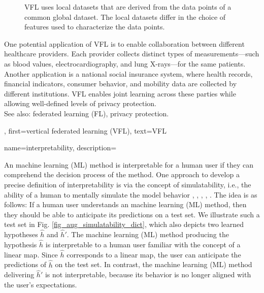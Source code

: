 {{{\begin{figure}[H]
\begin{center}
			\end{center}
			\caption{VFL uses local datasets that are derived from the data points of a common global dataset. 
				The local datasets differ in the choice of features used to characterize the data points.\label{fig_vertical_FL_dict}}
		\end{figure}
		One potential application of VFL is to enable collaboration between 
		different healthcare providers. Each provider collects distinct types of measurements—such as blood 
		values, electrocardiography, and lung X-rays—for the same patients. Another application is a 
		national social insurance system, where health records, financial indicators, consumer behavior, 
		and mobility data are collected by different institutions. VFL enables joint learning across 
		these parties while allowing well-defined levels of privacy protection.
		\\
		See also: federated learning (FL), privacy protection.},
	first={vertical federated learning (VFL)},
	text={VFL}
} 

{name={interpretability},
	description={An machine learning (ML) method is interpretable for a 
 		human user if they can comprehend the decision process of the method. 
		One approach to develop a precise definition of interpretability is via the concept  
 		of simulatability, i.e., the ability of a human to mentally simulate the model behavior 
		\cite{Colin:2022aa}, \cite{Chen2018}, \cite{doshi2017towards}, \cite{hase-bansal-2020-evaluating}, \cite{Lipton2018}. 
 		The idea is as follows: If a human user understands an machine learning (ML) method, then they should 
 		be able to anticipate its predictions on a test set. We illustrate 
 		such a test set in Fig. \ref{fig_aug_simulatability_dict}, which also depicts 
		two learned hypotheses $\hat{h}$ and $\hat{h}'$. 
		The machine learning (ML) method producing the hypothesis $\hat{h}$ is interpretable
		to a human user familiar with the concept of a linear map. 
    		Since $\hat{h}$ corresponds to a linear map, the user can 
		anticipate the predictions of $\hat{h}$ on the 
		test set. In contrast, the machine learning (ML) method delivering $\hat{h}'$ 
		is not interpretable, because its behavior is no longer aligned with the user’s 
		expectations.
 		\begin{figure}[H]
 			\begin{center} 
			\begin{tikzpicture}[x=1.5cm, y=1cm]
  			

\end{tikzpicture}
\end{center}
\end{figure}}}}
